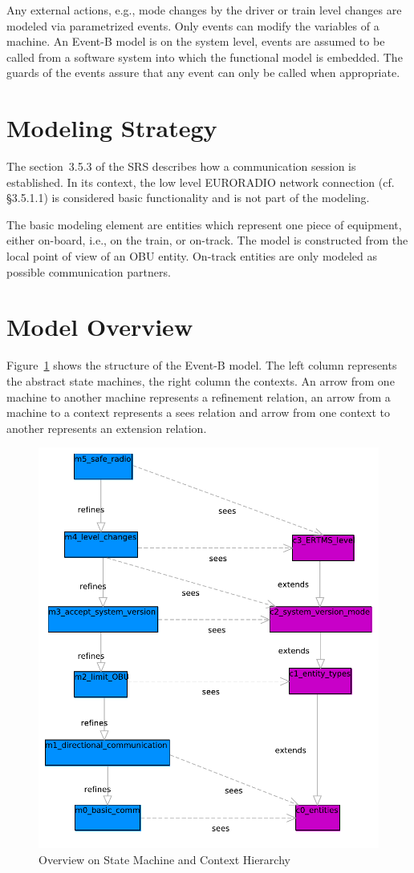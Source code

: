 \documentclass{template/openetcs_article}
\begin{document}
Any external actions, e.g., mode changes by the driver or train level changes
are modeled via parametrized events. Only events can modify the variables of a
machine. An Event-B model is on the system level, events are assumed to be
called from a software system into which the functional model is embedded. The
guards of the events assure that any event can only be called when appropriate.

\section{Modeling Strategy}
\label{sec:modeling-strategy}

The section~3.5.3 of the SRS describes how a communication session is
established. In its context, the low level EURORADIO network connection
(cf. §3.5.1.1) is considered basic functionality and is not part of the
modeling.

The basic modeling element are entities which represent one piece of equipment,
either on-board, i.e., on the train, or on-track. The model is constructed from
the local point of view of an OBU entity. On-track entities are only modeled as
possible communication partners.

\section{Model Overview}
\label{sec:model-overview}

Figure~\ref{fig:model-overview} shows the structure of the Event-B model. The
left column represents the abstract state machines, the right column the
contexts. An arrow from one machine to another machine represents a refinement
relation, an arrow from a machine to a context represents a sees relation and
arrow from one context to another represents an extension relation.

\begin{figure}[ht]
  \centering
  \includegraphics[width=.65\textwidth]{Subset_026_comm_session}
  \caption{Overview on State Machine and Context Hierarchy}
  \label{fig:model-overview}
\end{figure}
\end{document}

